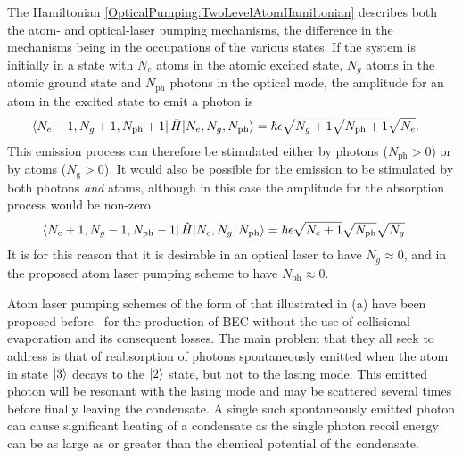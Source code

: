 The Hamiltonian \eqref{OpticalPumping:TwoLevelAtomHamiltonian} describes both the atom- and optical-laser pumping mechanisms, the difference in the mechanisms being in the occupations of the various states.  If the system is initially in a state with $N_e$ atoms in the atomic excited state, $N_g$ atoms in the atomic ground state and $N_\text{ph}$ photons in the optical mode, the amplitude for an atom in the excited state to emit a photon is
\begin{align}
    \left<N_e-1, N_g + 1, N_\text{ph} + 1\right| \hat{H} {\left|N_e, N_g, N_\text{ph}\right>} &= \hbar \epsilon \sqrt{N_g+1} \sqrt{N_\text{ph}+1} \sqrt{N_e}.
\end{align}
This emission process can therefore be stimulated either by photons ($N_\text{ph} > 0$) or by atoms ($N_\text{g} > 0$).  It would also be possible for the emission to be stimulated by both photons \emph{and} atoms, although in this case the amplitude for the absorption process would be non-zero
\begin{align}
    \left<N_e+1, N_g - 1, N_\text{ph} - 1\right| \hat{H} {\left|N_e, N_g, N_\text{ph}\right>} &= \hbar \epsilon \sqrt{N_e+1} \sqrt{N_\text{ph}} \sqrt{N_g}.
\end{align}
It is for this reason that it is desirable in an optical laser to have $N_g \approx 0$, and in the proposed atom laser pumping scheme to have $N_\text{ph} \approx 0$.

Atom laser pumping schemes of the form of that illustrated in (a) have been proposed before~\citep{Olshanii:1996,Janicke:1996,Spreeuw:1995,Cirac:1996rr,Cirac:1996,Santos:2000,Castin:1998,Cirac:1994,Vengalattore:2003,Santos:2001ve,Wolf:2000,Santos:1999qf} for the production of BEC without the use of collisional evaporation and its consequent losses.  The main problem that they all seek to address is that of reabsorption of photons spontaneously emitted when the atom in state ${\left|3\right>}$ decays to the ${\left|2\right>}$ state, but not to the lasing mode.  This emitted photon will be resonant with the lasing mode and may be scattered several times before finally leaving the condensate.  A single such spontaneously emitted photon can cause significant heating of a condensate as the single photon recoil energy can be as large as or greater than the chemical potential of the condensate.

